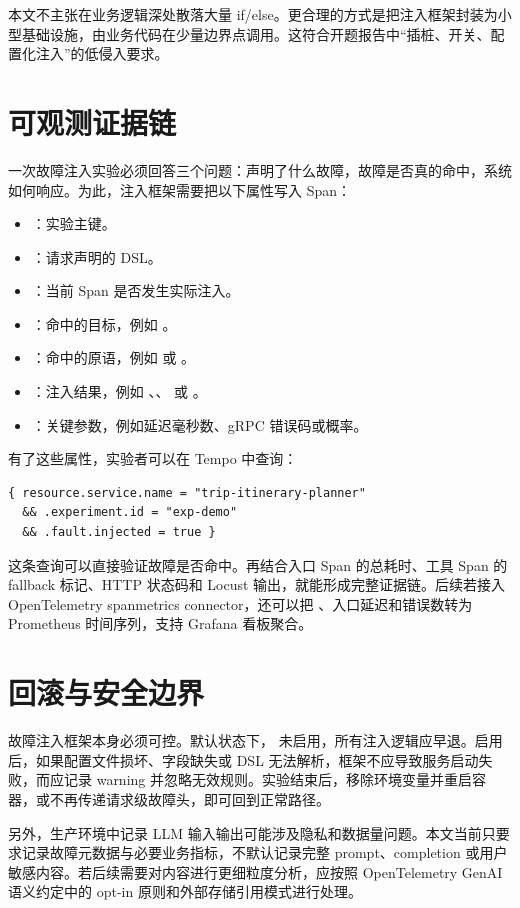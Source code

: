 本文不主张在业务逻辑深处散落大量 if/else。更合理的方式是把注入框架封装为小型基础设施，由业务代码在少量边界点调用。这符合开题报告中“插桩、开关、配置化注入”的低侵入要求。

\section{可观测证据链}

一次故障注入实验必须回答三个问题：声明了什么故障，故障是否真的命中，系统如何响应。为此，注入框架需要把以下属性写入 Span：

\begin{itemize}
  \item {}：实验主键。
  \item {}：请求声明的 DSL。
  \item {}：当前 Span 是否发生实际注入。
  \item {}：命中的目标，例如 。
  \item {}：命中的原语，例如  或 。
  \item {}：注入结果，例如 、、 或 。
  \item {}：关键参数，例如延迟毫秒数、gRPC 错误码或概率。
\end{itemize}

有了这些属性，实验者可以在 Tempo 中查询：

\begin{verbatim}
{ resource.service.name = "trip-itinerary-planner"
  && .experiment.id = "exp-demo"
  && .fault.injected = true }
\end{verbatim}

这条查询可以直接验证故障是否命中。再结合入口 Span 的总耗时、工具 Span 的 fallback 标记、HTTP 状态码和 Locust 输出，就能形成完整证据链。后续若接入 OpenTelemetry spanmetrics connector，还可以把 、入口延迟和错误数转为 Prometheus 时间序列，支持 Grafana 看板聚合。

\section{回滚与安全边界}

故障注入框架本身必须可控。默认状态下， 未启用，所有注入逻辑应早退。启用后，如果配置文件损坏、字段缺失或 DSL 无法解析，框架不应导致服务启动失败，而应记录 warning 并忽略无效规则。实验结束后，移除环境变量并重启容器，或不再传递请求级故障头，即可回到正常路径。

另外，生产环境中记录 LLM 输入输出可能涉及隐私和数据量问题。本文当前只要求记录故障元数据与必要业务指标，不默认记录完整 prompt、completion 或用户敏感内容。若后续需要对内容进行更细粒度分析，应按照 OpenTelemetry GenAI 语义约定中的 opt-in 原则和外部存储引用模式进行处理\cite{otelGenAISpans}。
